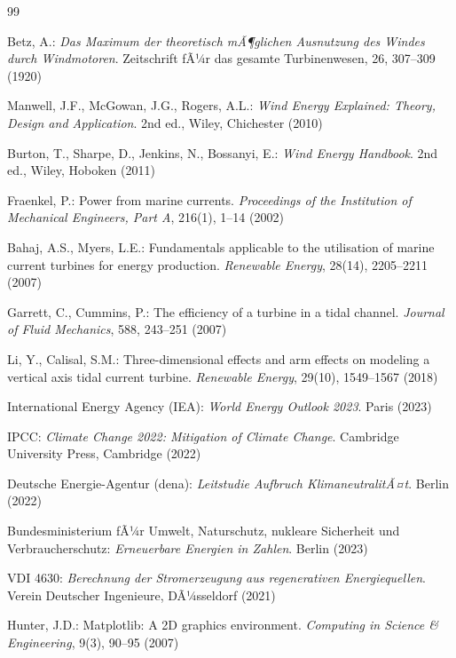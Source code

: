 ﻿\documentclass[a4paper,12pt]{article}
\theoremstyle{definition}
\begin{document}
\begin{thebibliography}{99}

Betz, A.:
\textit{Das Maximum der theoretisch mÃ¶glichen Ausnutzung des Windes durch Windmotoren}.
Zeitschrift fÃ¼r das gesamte Turbinenwesen, 26, 307--309 (1920)

Manwell, J.F., McGowan, J.G., Rogers, A.L.:
\textit{Wind Energy Explained: Theory, Design and Application}.
2nd ed., Wiley, Chichester (2010)

Burton, T., Sharpe, D., Jenkins, N., Bossanyi, E.:
\textit{Wind Energy Handbook}.
2nd ed., Wiley, Hoboken (2011)

Fraenkel, P.:
Power from marine currents.
\textit{Proceedings of the Institution of Mechanical Engineers, Part A}, 216(1), 1--14 (2002)

Bahaj, A.S., Myers, L.E.:
Fundamentals applicable to the utilisation of marine current turbines for energy production.
\textit{Renewable Energy}, 28(14), 2205--2211 (2007)

Garrett, C., Cummins, P.:
The efficiency of a turbine in a tidal channel.
\textit{Journal of Fluid Mechanics}, 588, 243--251 (2007)

Li, Y., Calisal, S.M.:
Three-dimensional effects and arm effects on modeling a vertical axis tidal current turbine.
\textit{Renewable Energy}, 29(10), 1549--1567 (2018)

International Energy Agency (IEA):
\textit{World Energy Outlook 2023}.
Paris (2023)

IPCC:
\textit{Climate Change 2022: Mitigation of Climate Change}.
Cambridge University Press, Cambridge (2022)

Deutsche Energie-Agentur (dena):
\textit{Leitstudie Aufbruch KlimaneutralitÃ¤t}.
Berlin (2022)

Bundesministerium fÃ¼r Umwelt, Naturschutz, nukleare Sicherheit und Verbraucherschutz:
\textit{Erneuerbare Energien in Zahlen}.
Berlin (2023)

VDI 4630:
\textit{Berechnung der Stromerzeugung aus regenerativen Energiequellen}.
Verein Deutscher Ingenieure, DÃ¼sseldorf (2021)

Hunter, J.D.:
Matplotlib: A 2D graphics environment.
\textit{Computing in Science \& Engineering}, 9(3), 90--95 (2007)


\end{thebibliography}
\end{document}
